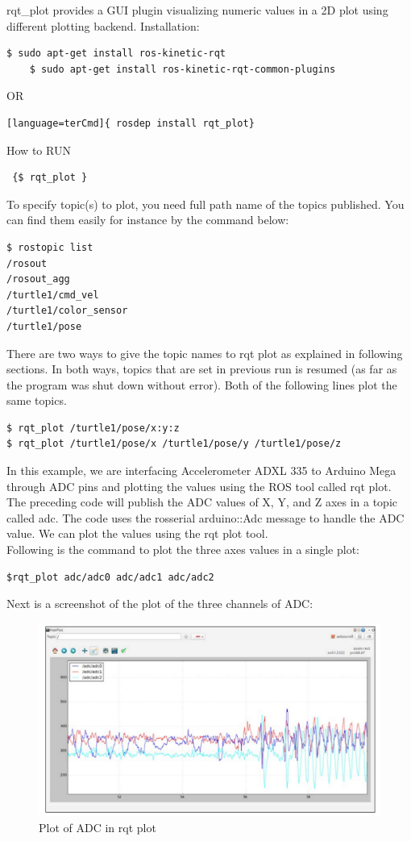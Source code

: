 rqt\_plot provides a GUI plugin visualizing numeric values in a 2D plot using different plotting backend.
Installation:
\begin{lstlisting}[language=terCmd]
	$ sudo apt-get install ros-kinetic-rqt
	$ sudo apt-get install ros-kinetic-rqt-common-plugins
\end{lstlisting}

OR
\begin{lstlisting}
[language=terCmd]{ rosdep install rqt_plot} 
\end{lstlisting}
How to RUN
\begin{lstlisting}
 {$ rqt_plot }
\end{lstlisting}

To specify topic(s) to plot, you need full path name of the topics published. You can find them easily for instance by the command below:
\begin{lstlisting}[language=terCmd]
$ rostopic list
/rosout        
/rosout_agg
/turtle1/cmd_vel
/turtle1/color_sensor
/turtle1/pose
\end{lstlisting}
There are two ways to give the topic names to rqt plot as explained in following sections. In both ways, topics that are set in previous run is resumed (as far as the program was shut down without error).
Both of the following lines plot the same topics.
\begin{lstlisting}[language=terCmd]
$ rqt_plot /turtle1/pose/x:y:z
$ rqt_plot /turtle1/pose/x /turtle1/pose/y /turtle1/pose/z
\end{lstlisting}
In this example, we are interfacing Accelerometer ADXL 335 to Arduino Mega through ADC pins and plotting the values using the ROS tool called rqt plot.
The preceding code will publish the ADC values of X, Y, and Z axes in a topic called adc. The code uses the rosserial arduino::Adc message to handle the ADC value. We can plot the values using the rqt plot tool.\\

Following is the command to plot the three axes values in a single plot:
\begin{lstlisting}[language=terCmd] 
$rqt_plot adc/adc0 adc/adc1 adc/adc2
\end{lstlisting}
Next is a screenshot of the plot of the three channels of ADC:
\begin{figure}[H]
	\centering
	\includegraphics[width =.8\textwidth]{figures/ADC}
	\caption{Plot of ADC in rqt plot}
	\label{Fig:ADC}
\end{figure}